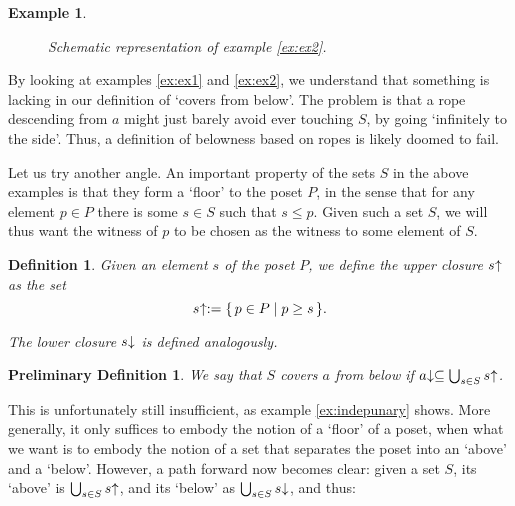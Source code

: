 \documentclass{article}
\newtheorem{example}[theorem]{Example}
\newtheorem{prelimdef}[theorem]{Preliminary Definition}
\newtheorem{definition}[theorem]{Definition}
\theoremstyle{nonumberplain}
\newcommand{\upcl}[1]{{#1}\hspace{-0.25em}\uparrow}
\newcommand{\dncl}[1]{{#1}\hspace{-0.25em}\downarrow}
\begin{document}
\begin{example}
\begin{figure}[H]
\caption{Schematic representation of example \ref{ex:ex2}.}\label{fig:ex2}
\end{figure}
\end{example}

By looking at examples \ref{ex:ex1} and \ref{ex:ex2}, we understand that something is lacking in our definition of `covers from below'. The problem is that a rope descending from $a$ might just barely avoid ever touching $S$, by going `infinitely to the side'. Thus, a definition of belowness based on ropes is likely doomed to fail.

Let us try another angle. An important property of the sets $S$ in the above examples is that they form a `floor' to the poset $P$, in the sense that for any element $p \in P$ there is some $s \in S$ such that $s \leq p$. Given such a set $S$, we will thus want the witness of $p$ to be chosen as the witness to some element of $S$.

\begin{definition}
Given an element $s$ of the poset $P$, we define the upper closure $\upcl s$ as the set
\begin{equation}
\upcl s := \{\,p \in P \mid p \geq s\,\}.
\end{equation}

The lower closure $\dncl s$ is defined analogously.
\end{definition}

\begin{prelimdef}
We say that $S$ covers $a$ from below if $\dncl a \subseteq \bigcup_{s \in S} \upcl s$.
\end{prelimdef}

This is unfortunately still insufficient, as example \ref{ex:indepunary} shows. More generally, it only suffices to embody the notion of a `floor' of a poset, when what we want is to embody the notion of a set that separates the poset into an `above' and a `below'. However, a path forward now becomes clear: given a set $S$, its `above' is $\bigcup_{s \in S} \upcl s$, and its `below' as $\bigcup_{s \in S} \dncl s$, and thus:
\end{document}
